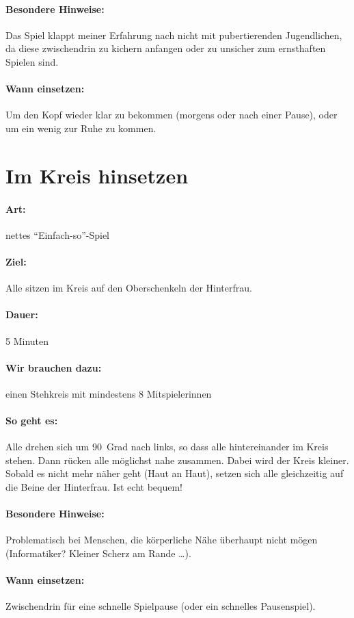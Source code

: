 \paragraph{Besondere Hinweise:} Das Spiel klappt meiner Erfahrung nach nicht mit pubertierenden Jugendlichen, da diese zwischendrin zu kichern anfangen oder zu unsicher zum ernsthaften Spielen sind.
\paragraph{Wann einsetzen:} Um den Kopf wieder klar zu bekommen (morgens oder nach einer Pause), oder um ein wenig zur Ruhe zu kommen.

\section{Im Kreis hinsetzen}
\paragraph{Art:} nettes "`Einfach-so"'-Spiel
\paragraph{Ziel:} Alle sitzen im Kreis auf den Oberschenkeln der Hinterfrau.
\paragraph{Dauer:} 5 Minuten
\paragraph{Wir brauchen dazu:} einen Stehkreis mit mindestens 8 Mitspielerinnen
\paragraph{So geht es:} Alle drehen sich um 90~Grad nach links, so dass alle hintereinander im Kreis stehen. Dann rücken alle möglichst nahe zusammen. Dabei wird der Kreis kleiner. Sobald es nicht mehr näher geht (Haut an Haut), setzen sich alle gleichzeitig auf die Beine der Hinterfrau. Ist echt bequem!
\paragraph{Besondere Hinweise:} Problematisch bei Menschen, die körperliche Nähe überhaupt nicht mögen (Informatiker? Kleiner Scherz am Rande \ldots).
\paragraph{Wann einsetzen:} Zwischendrin für eine schnelle Spielpause (oder ein schnelles Pausenspiel).

